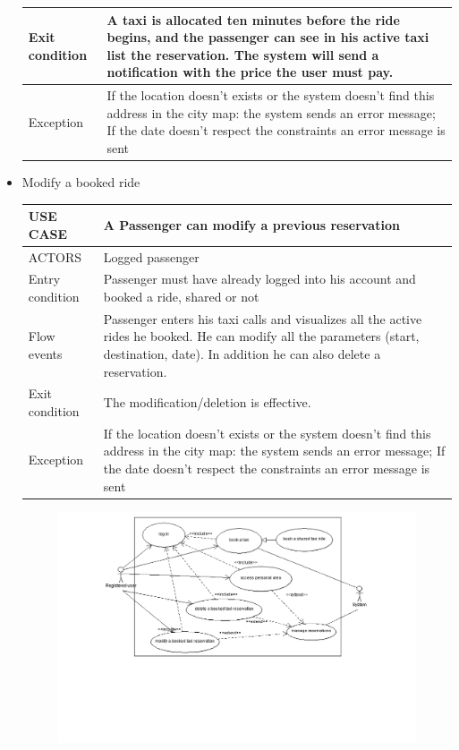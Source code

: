\begin{itemize}
\begin{center}
\begin{tabular}{ | l | p{11cm} |}
  	   Exit condition & A taxi is allocated ten minutes before the ride begins, and the passenger can see in his active taxi list the reservation.
The system will send a notification with the price the user must pay.\\ \hline
  	   Exception &  If the location doesn’t exists or the system doesn’t find this address in the city map: the system sends an error message;
If the date doesn’t respect the constraints an error message is sent\\ \hline
    \end{tabular}
	\end{center}
\item Modify a booked ride
	\begin{center}
   	 \begin{tabular}{ | l | p{11cm} |}
   	 \hline
   	USE CASE & A Passenger can modify a previous reservation\\ \hline
   	 ACTORS & Logged passenger \\ \hline
    	 Entry condition & Passenger must have already logged into his account and booked a ride, shared or not\\ \hline
    	 Flow events & Passenger enters his taxi calls and visualizes all the active rides he booked. He can modify all the parameters (start, destination, date).
In addition he can also delete a reservation.\\ \hline
  	   Exit condition & The modification/deletion is effective.\\ \hline
  	   Exception &  If the location doesn’t exists or the system doesn’t find this address in the city map: the system sends an error message;
If the date doesn’t respect the constraints an error message is sent\\ \hline
    \end{tabular}
	\end{center}
	\begin{center}
	\begin{figure} [h]
    	\includegraphics [scale=0.5]{bookataxi.png}

\end{figure}
\end{center}
\end{itemize}

